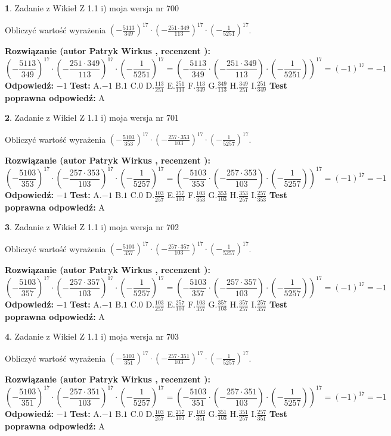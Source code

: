 \documentclass[12pt, a4paper]{article}
\theoremstyle{definition} %
\newtheorem{zad}{}
\newcommand{\zadStart}[1]{\begin{zad}#1\newline}
\newcommand{\zadStop}{\end{zad}}
\newcommand{\rozwStart}[2]{\noindent \textbf{Rozwiązanie (autor #1 , recenzent #2): }\newline}
\newcommand{\rozwStop}{\newline}
\newcommand{\odpStart}{\noindent \textbf{Odpowiedź:}\newline}
\newcommand{\odpStop}{\newline}
\newcommand{\testStart}{\noindent \textbf{Test:}\newline}
\newcommand{\testStop}{\newline}
\newcommand{\kluczStart}{\noindent \textbf{Test poprawna odpowiedź:}\newline}
\newcommand{\kluczStop}{\newline}
\begin{document}
\zadStart{Zadanie z Wikieł Z 1.1 i) moja wersja nr 700}

Obliczyć wartość wyrażenia $(-\frac{5113}{349})^{17} \cdot (-\frac{251 \cdot 349}{113})^{17} \cdot (-\frac{1}{5251})^{17}$.
\zadStop
\rozwStart{Patryk Wirkus}{}
$$(-\frac{5113}{349})^{17} \cdot (-\frac{251 \cdot 349}{113})^{17} \cdot (-\frac{1}{5251})^{17} = (-\frac{5113}{349} \cdot (-\frac{251 \cdot 349}{113}) \cdot (-\frac{1}{5251}))^{17} = (-1)^{17} = -1$$
\rozwStop
\odpStart
$-1$
\odpStop
\testStart
A.$-1$ B.$1$ C.$0$ D.$\frac{113}{251}$ E.$\frac{251}{113}$
F.$\frac{113}{349}$ G.$\frac{349}{113}$
H.$\frac{349}{251}$
I.$\frac{251}{349}$
\testStop
\kluczStart
A
\kluczStop



\zadStart{Zadanie z Wikieł Z 1.1 i) moja wersja nr 701}

Obliczyć wartość wyrażenia $(-\frac{5103}{353})^{17} \cdot (-\frac{257 \cdot 353}{103})^{17} \cdot (-\frac{1}{5257})^{17}$.
\zadStop
\rozwStart{Patryk Wirkus}{}
$$(-\frac{5103}{353})^{17} \cdot (-\frac{257 \cdot 353}{103})^{17} \cdot (-\frac{1}{5257})^{17} = (-\frac{5103}{353} \cdot (-\frac{257 \cdot 353}{103}) \cdot (-\frac{1}{5257}))^{17} = (-1)^{17} = -1$$
\rozwStop
\odpStart
$-1$
\odpStop
\testStart
A.$-1$ B.$1$ C.$0$ D.$\frac{103}{257}$ E.$\frac{257}{103}$
F.$\frac{103}{353}$ G.$\frac{353}{103}$
H.$\frac{353}{257}$
I.$\frac{257}{353}$
\testStop
\kluczStart
A
\kluczStop



\zadStart{Zadanie z Wikieł Z 1.1 i) moja wersja nr 702}

Obliczyć wartość wyrażenia $(-\frac{5103}{357})^{17} \cdot (-\frac{257 \cdot 357}{103})^{17} \cdot (-\frac{1}{5257})^{17}$.
\zadStop
\rozwStart{Patryk Wirkus}{}
$$(-\frac{5103}{357})^{17} \cdot (-\frac{257 \cdot 357}{103})^{17} \cdot (-\frac{1}{5257})^{17} = (-\frac{5103}{357} \cdot (-\frac{257 \cdot 357}{103}) \cdot (-\frac{1}{5257}))^{17} = (-1)^{17} = -1$$
\rozwStop
\odpStart
$-1$
\odpStop
\testStart
A.$-1$ B.$1$ C.$0$ D.$\frac{103}{257}$ E.$\frac{257}{103}$
F.$\frac{103}{357}$ G.$\frac{357}{103}$
H.$\frac{357}{257}$
I.$\frac{257}{357}$
\testStop
\kluczStart
A
\kluczStop



\zadStart{Zadanie z Wikieł Z 1.1 i) moja wersja nr 703}

Obliczyć wartość wyrażenia $(-\frac{5103}{351})^{17} \cdot (-\frac{257 \cdot 351}{103})^{17} \cdot (-\frac{1}{5257})^{17}$.
\zadStop
\rozwStart{Patryk Wirkus}{}
$$(-\frac{5103}{351})^{17} \cdot (-\frac{257 \cdot 351}{103})^{17} \cdot (-\frac{1}{5257})^{17} = (-\frac{5103}{351} \cdot (-\frac{257 \cdot 351}{103}) \cdot (-\frac{1}{5257}))^{17} = (-1)^{17} = -1$$
\rozwStop
\odpStart
$-1$
\odpStop
\testStart
A.$-1$ B.$1$ C.$0$ D.$\frac{103}{257}$ E.$\frac{257}{103}$
F.$\frac{103}{351}$ G.$\frac{351}{103}$
H.$\frac{351}{257}$
I.$\frac{257}{351}$
\testStop
\kluczStart
A
\kluczStop
\end{document}
